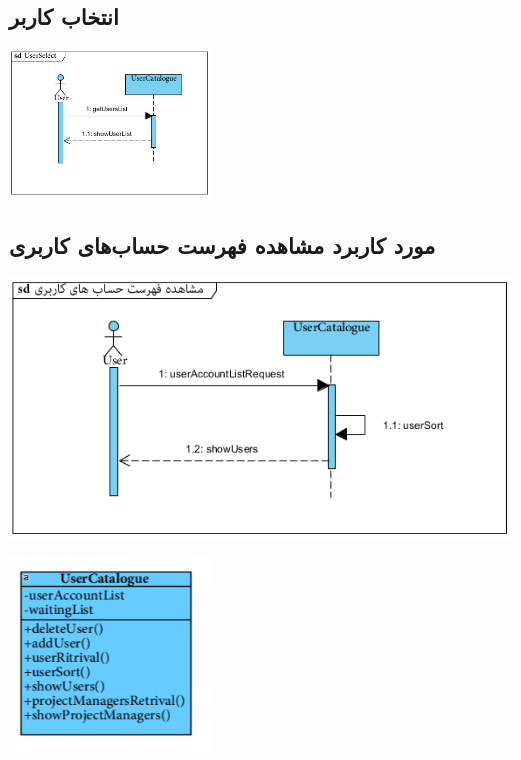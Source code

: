 \newpage
\vspace{1cm}
\subsection*{انتخاب کاربر}
\vspace{2cm}
\begin{center}
\includegraphics[width=0.4\textwidth]{SequenceDiagrams/extra.png}
\end{center}

\newpage
\vspace{2cm}
\subsection*{مورد کاربرد مشاهده فهرست حساب‌های کاربری}
\vspace{2cm}
\begin{center}
\includegraphics[width=\textwidth]{SequenceDiagrams/2.png}
\end{center}

\newpage
\vspace{2cm}
\begin{center}
\includegraphics[width=0.4\textwidth]{SequenceClasses/2.png}
\end{center}

